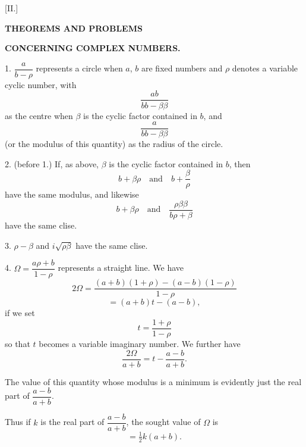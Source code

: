 
\begin{center}
[II.]

\textbf{THEOREMS AND PROBLEMS}

\textbf{CONCERNING COMPLEX NUMBERS.}
\end{center}

1. $\dfrac{a}{b-\rho}$ represents a circle when $a$, $b$ are fixed numbers and $\rho$ denotes
a variable cyclic number, with
\[
\dfrac{ab}{bb-\beta\beta}
\]
as the centre when $\beta$ is the cyclic factor contained in $b$, and
\[
\dfrac{a}{bb-\beta\beta}
\]
(or the modulus of this quantity) as the radius of the circle.

2. (before 1.) If, as above, $\beta$ is the cyclic factor contained in $b$, then
\[
b + \beta\rho \quad \text{and} \quad b + \dfrac{\beta}{\rho}
\]
have the same modulus, and likewise
\[
b + \beta\rho \quad \text{and} \quad \dfrac{\rho\beta\beta}{b\rho+\beta}
\]
have the same clise.

3. $\rho - \beta$ and $i\sqrt{\rho\beta}$ have the same clise.

4. $\Omega = \dfrac{a\rho+b}{1-\rho}$ represents a straight line. We have
\[
2\Omega = \dfrac{(a+b)(1+\rho) - (a-b)(1-\rho)}{1-\rho}
\]
\[
= (a+b)t - (a-b),
\]
if we set
\[
t = \dfrac{1+\rho}{1-\rho}
\]
so that $t$ becomes a variable imaginary number. We further have
\[
\dfrac{2\Omega}{a+b} = t - \dfrac{a-b}{a+b}.
\]

The value of this quantity whose modulus is a minimum is evidently
just the real part of $\dfrac{a-b}{a+b}$.

Thus if $k$ is the real part of $\dfrac{a-b}{a+b}$, the
sought value of $\Omega$ is
\[
= \tfrac{1}{2} k (a+b).
\]
